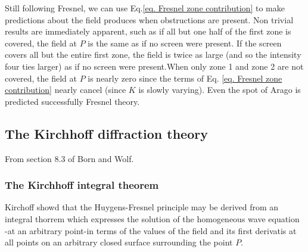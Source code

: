 \documentclass[../../main.tex]{subfiles} %
\begin{document}
Still following Fresnel, we can use Eq.\ref{eq. Fresnel zone contribution} to make predictions about the field produces when obstructions are present. Non trivial results are immediately apparent, such as if all but one half of the first zone is covered, the field at $P$ is the same as if no screen were present. If the screen covers all but the entire first zone, the field is twice as large (and so the intensity four ties larger) as if no screen were present.When only zone 1 and zone 2 are not covered, the field at $P$ is nearly zero since the terms of Eq. \ref{eq. Fresnel zone contribution} nearly cancel (since $K$ is slowly varying). Even the spot of Arago is predicted successfully Fresnel theory.

\subsection{The Kirchhoff diffraction theory}
From section 8.3 of Born and Wolf.
\subsubsection{The Kirchhoff integral theorem}
Kirchoff showd that the Huygens-Fresnel principle may be derived from an integral thorrem which expresses the solution of the homogeneous wave equation -at an arbitrary point-in terms of the values of the field and its first derivatis at all points on an arbitrary closed surface surrounding the point $P$. 
\end{document}

